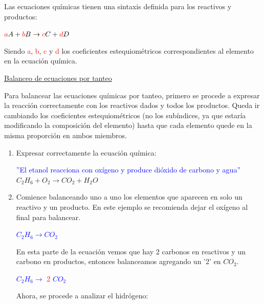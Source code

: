             \indent Las ecuaciones químicas tienen una sintaxis definida para los reactivos y productos:
            \begin{center}  \end{center}
            \begin{center}
                $\textcolor{red}{a}A + \textcolor{red}{b}B \rightarrow \textcolor{red}{c}C + \textcolor{red}{d}D$ \\
            \end{center}
            \indent Siendo \textcolor{red}{a}, \textcolor{red}{b}, \textcolor{red}{c} y \textcolor{red}{d} los coeficientes estequiométricos correspondientes al elemento en la ecuación química. \\
        \begin{center} \underline{Balanceo de ecuaciones por tanteo} \end{center}
            \indent Para balancear las ecuaciones químicas por tanteo, primero se procede a expresar la reacción correctamente con los reactivos dados y todos los productos. Queda ir cambiando los coeficientes estequiométricos (no los subíndices, ya que estaría modificando la composición del elemento) hasta que cada elemento quede en la misma proporción en ambos miembros. 
            \begin{enumerate}
                \item Expresar correctamente la ecuación química:
                \begin{center}
                    \textcolor{blue}{''El etanol reacciona con oxígeno y produce dióxido de carbono y agua''} \\ 
                    $ C_2H_6 + O_2 \rightarrow CO_2 + H_2O$ \\
                \end{center}

            \item Comience balanceando uno a uno los elementos que aparecen en solo un reactivo y un producto. En este ejemplo se recomienda dejar el oxígeno al final para balancear.
                \begin{center}
                    \textcolor{blue}{$C_2H_6 \rightarrow CO_2$}
                \end{center}

                \indent En esta parte de la ecuación vemos que hay 2 carbonos en reactivos y un carbono en productos, entonces balanceamos agregando un '2' en $CO_2$.

                \begin{center}
                    \textcolor{blue}{$C_2H_6 \rightarrow$} \textcolor{red}{2} \textcolor{blue}{$CO_2$}
                \end{center}

                \indent Ahora, se procede a analizar el hidrógeno:
                \begin{center}
                    
                \end{center}
            \end{enumerate}
